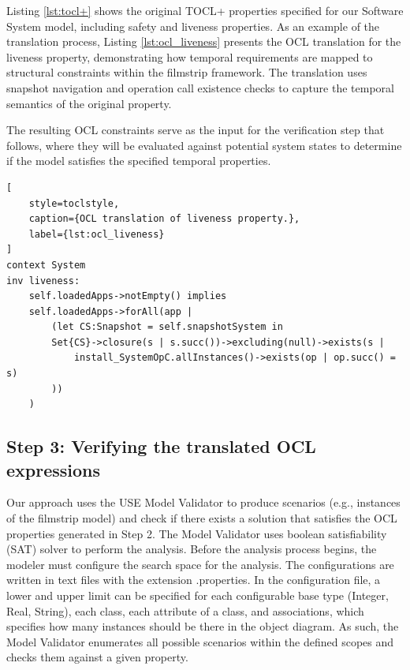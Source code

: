 Listing \ref{lst:tocl+} shows the original TOCL+ properties specified for our Software System model, including safety and liveness properties. As an example of the translation process, Listing \ref{lst:ocl_liveness} presents the OCL translation for the liveness property, demonstrating how temporal requirements are mapped to structural constraints within the filmstrip framework. The translation uses snapshot navigation and operation call existence checks to capture the temporal semantics of the original property.

The resulting OCL constraints serve as the input for the verification step that follows, where they will be evaluated against potential system states to determine if the model satisfies the specified temporal properties.

\begin{lstlisting}[
    style=toclstyle, 
    caption={OCL translation of liveness property.}, 
    label={lst:ocl_liveness}
]
context System
inv liveness:
    self.loadedApps->notEmpty() implies
    self.loadedApps->forAll(app |
        (let CS:Snapshot = self.snapshotSystem in 
        Set{CS}->closure(s | s.succ())->excluding(null)->exists(s | 
            install_SystemOpC.allInstances()->exists(op | op.succ() = s)
        ))
    )
\end{lstlisting}

\subsection{Step 3: Verifying the translated OCL expressions}

Our approach uses the USE Model Validator \cite{USE_Validator} to produce
scenarios (e.g., instances of the filmstrip model) and check if there exists a
solution that satisfies the OCL properties generated in Step 2. The Model Validator 
uses boolean satisfiability (SAT) solver to perform the analysis. Before the 
analysis process begins, the modeler must configure the search space for the analysis.
The configurations are written in text files with the extension .properties. 
In the configuration file, a lower and upper limit can be specified for each 
configurable base type (Integer, Real, String), each class, each attribute of a 
class, and associations, which specifies how many instances should be there in the 
object diagram. As such, the Model Validator enumerates all possible scenarios
within the defined scopes and checks them against a given property. 